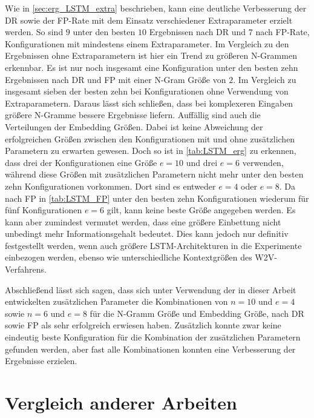 Wie in \autoref{sec:erg_LSTM_extra} beschrieben, kann eine deutliche Verbesserung der \ac{DR} sowie  der \ac{FP}-Rate mit dem Einsatz verschiedener Extraparameter erzielt werden.
So sind $9$ unter den besten $10$ Ergebnissen nach \ac{DR} und $7$ nach \ac{FP}-Rate, Konfigurationen mit mindestens einem Extraparameter.
Im Vergleich zu den Ergebnissen ohne Extraparametern ist hier ein Trend zu größeren N-Grammen erkennbar.
Es ist nur noch insgesamt eine Konfiguration unter den besten zehn Ergebnissen nach \ac{DR} und \ac{FP} mit einer N-Gram Größe von $2$.
Im Vergleich zu insgesamt sieben  der besten zehn bei Konfigurationen ohne Verwendung von Extraparametern.
Daraus lässt sich schließen, dass bei komplexeren Eingaben größere N-Gramme bessere Ergebnisse liefern. 
Auffällig sind auch die Verteilungen der Embedding Größen.
Dabei ist keine Abweichung der erfolgreichen Größen zwischen den Konfigurationen mit und ohne zusätzlichen Parametern zu erwarten gewesen.
Doch so ist in \autoref{tab:LSTM_erg} zu erkennen, dass drei der Konfigurationen eine Größe $e=10$ und drei $e=6$ verwenden, während diese Größen mit zusätzlichen Parametern nicht mehr unter den besten zehn Konfigurationen vorkommen.
Dort sind es entweder $e=4$ oder $e=8$.
Da nach \ac{FP} in \autoref{tab:LSTM_FP} unter den besten zehn Konfigurationen wiederum für fünf Konfigurationen $e=6$ gilt, kann keine beste Größe angegeben werden.
Es kann aber zumindest vermutet werden, dass eine größere Einbettung nicht unbedingt mehr Informationsgehalt bedeutet.
Dies kann jedoch nur definitiv festgestellt werden, wenn auch größere \ac{LSTM}-Architekturen in die Experimente einbezogen werden, ebenso wie unterschiedliche Kontextgrößen des \ac{W2V}-Verfahrens.

Abschließend lässt sich sagen, dass sich unter Verwendung der in dieser Arbeit entwickelten zusätzlichen Parameter die Kombinationen von $n=10$ und $e=4$ sowie $n=6$ und $e=8$ für die N-Gramm Größe und Embedding Größe, nach \ac{DR} sowie \ac{FP} als sehr erfolgreich erwiesen haben.
Zusätzlich konnte zwar keine eindeutig beste Konfiguration für die Kombination der zusätzlichen Parametern gefunden werden, aber fast alle Kombinationen konnten eine Verbesserung der Ergebnisse erzielen.

\section{Vergleich anderer Arbeiten}\label{sec:folgerungen_vgl}

